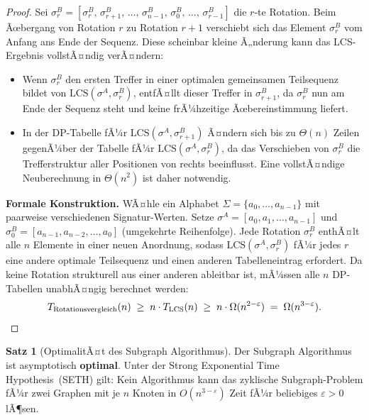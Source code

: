 ﻿\documentclass[a4paper,12pt]{article}
\theoremstyle{definition}
\newtheorem{satz}{Satz}
\begin{document}
\begin{proof}
Sei $\sigma^B_r = [\sigma_r^B,\, \sigma_{r+1}^B,\, \ldots,\, \sigma_{n-1}^B,\, \sigma_0^B,\, \ldots,\, \sigma_{r-1}^B]$ die $r$-te Rotation.
Beim Ãœbergang von Rotation $r$ zu Rotation $r+1$ verschiebt sich das Element $\sigma_r^B$ vom Anfang ans Ende der Sequenz.
Diese scheinbar kleine Ã„nderung kann das LCS-Ergebnis vollstÃ¤ndig verÃ¤ndern:

\begin{itemize}
	\item Wenn $\sigma_r^B$ den ersten Treffer in einer optimalen gemeinsamen Teilsequenz bildet von $\mathrm{LCS}(\sigma^A, \sigma^B_r)$, entfÃ¤llt dieser Treffer in $\sigma^B_{r+1}$,
	      da $\sigma_r^B$ nun am Ende der Sequenz steht und keine frÃ¼hzeitige Ãœbereinstimmung liefert.
	\item In der DP-Tabelle fÃ¼r $\mathrm{LCS}(\sigma^A, \sigma^B_{r+1})$ Ã¤ndern sich bis zu $\Theta(n)$
	      Zeilen gegenÃ¼ber der Tabelle fÃ¼r $\mathrm{LCS}(\sigma^A, \sigma^B_r)$, da das Verschieben von
	      $\sigma_r^B$ die Trefferstruktur aller Positionen von rechts beeinflusst.
	      Eine vollstÃ¤ndige Neuberechnung in $\Theta(n^2)$ ist daher notwendig.
\end{itemize}

\textbf{Formale Konstruktion.}
WÃ¤hle ein Alphabet $\Sigma = \{a_0, \ldots, a_{n-1}\}$ mit paarweise verschiedenen Signatur-Werten.
Setze $\sigma^A = [a_0, a_1, \ldots, a_{n-1}]$ und $\sigma^B_0 = [a_{n-1}, a_{n-2}, \ldots, a_0]$
(umgekehrte Reihenfolge).
Jede Rotation $\sigma^B_r$ enthÃ¤lt alle $n$ Elemente in einer neuen Anordnung, sodass
$\mathrm{LCS}(\sigma^A, \sigma^B_r)$ fÃ¼r jedes $r$ eine andere optimale Teilsequenz und einen anderen Tabelleneintrag erfordert.
Da keine Rotation strukturell aus einer anderen ableitbar ist, mÃ¼ssen alle $n$ DP-Tabellen unabhÃ¤ngig berechnet werden:
\[
	T_{\text{Rotationsvergleich}}(n) \;\geq\; n \cdot T_{\mathrm{LCS}}(n) \;\geq\; n \cdot \Omega(n^{2-\varepsilon}) \;=\; \Omega(n^{3-\varepsilon}). \qedhere
\]
\end{proof}

\begin{satz}[OptimalitÃ¤t des Subgraph Algorithmus]
\label{satz:optimalitaet}
Der Subgraph Algorithmus ist asymptotisch \textbf{optimal}.
Unter der Strong Exponential Time Hypothesis~(SETH) gilt: Kein Algorithmus kann das zyklische Subgraph-Problem fÃ¼r zwei Graphen mit je $n$ Knoten in $O(n^{3-\varepsilon})$ Zeit fÃ¼r beliebiges $\varepsilon > 0$ lÃ¶sen.
\end{satz}
\end{document}
